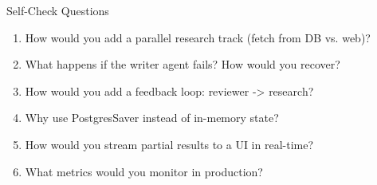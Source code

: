 \documentclass[aspectratio=169,11pt]{beamer}
\begin{document}
\begin{frame}{Self-Check Questions}
\setlength{\itemsep}{2pt}
\begin{enumerate}
\item How would you add a parallel research track (fetch from DB vs. web)?
\item What happens if the writer agent fails? How would you recover?
\item How would you add a feedback loop: reviewer -> research?
\item Why use PostgresSaver instead of in-memory state?
\item How would you stream partial results to a UI in real-time?
\item What metrics would you monitor in production?
\end{enumerate}
\end{frame}
\end{document}
